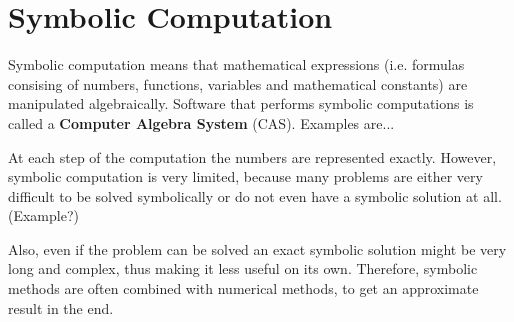 \section{Symbolic Computation}
Symbolic computation means that mathematical expressions (i.e. formulas consising of numbers, functions, variables and mathematical constants) are manipulated algebraically.
Software that performs symbolic computations is called a \textbf{Computer Algebra System} (CAS).
Examples are...

At each step of the computation the numbers are represented exactly.
However, symbolic computation is very limited, because many problems are either 
very difficult to be solved symbolically or do not even have a symbolic solution at all. (Example?)

Also, even if the problem can be solved an exact symbolic solution might be very long and complex, 
thus making it less useful on its own. 
Therefore, symbolic methods are often combined with numerical methods, 
to get an approximate result in the end.
